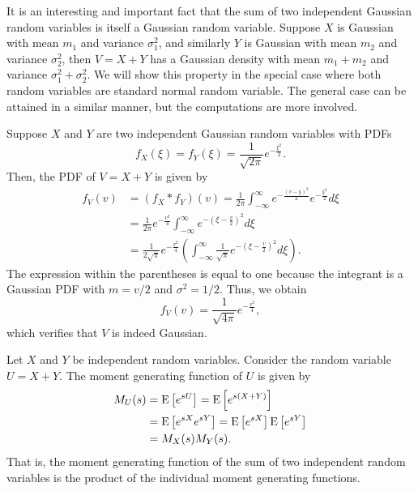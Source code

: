 \begin{example}
It is an interesting and important fact that the sum of two independent Gaussian random variables is itself a Gaussian random variable.
Suppose $X$ is Gaussian with mean $m_1$ and variance $\sigma_1^2$, and similarly $Y$ is Gaussian with mean $m_2$ and variance $\sigma_2^2$, then $V = X + Y$ has a Gaussian density with mean $m_1 + m_2$ and variance $\sigma_1^2 + \sigma_2^2$.
We will show this property in the special case where both random variables are standard normal random variable.
The general case can be attained in a similar manner, but the computations are more involved.

Suppose $X$ and $Y$ are two independent Gaussian random variables with PDFs
\begin{equation*}
f_X(\xi) = f_Y(\xi) = \frac 1{\sqrt{2\pi}} e^{-\frac{\xi^2}{2}} .
\end{equation*}
Then, the PDF of $V = X + Y$ is given by
\begin{equation*}
\begin{split}
f_V (v) &= (f_X \ast f_Y) (v)
= \frac{1}{2\pi}
\int_{-\infty}^{\infty} e^{-\frac{(v - \xi)^2}{2}} e^{-\frac{\xi^2}{2}} d\xi \\
&= \frac{1}{2\pi} e^{- \frac{v^2}{4}}
\int_{-\infty}^{\infty} e^{- \left( \xi - \frac{v}{2} \right)^2} d\xi \\
&= \frac{1}{2 \sqrt{\pi}} e^{- \frac{v^2}{4}}
\left( \int_{-\infty}^{\infty} \frac{1}{\sqrt{\pi}}
e^{-\left( \xi - \frac{v}{2} \right)^2} d\xi \right) .
\end{split}
\end{equation*}
The expression within the parentheses is equal to one because the integrant is a Gaussian PDF with $m = v/2$ and $\sigma^2 = 1/2$.
Thus, we obtain
\begin{equation*}
f_V(v) = \frac{1}{\sqrt{4\pi}} e^{-\frac{v^2}{4}} ,
\end{equation*}
which verifies that $V$ is indeed Gaussian.
\end{example}

Let $X$ and $Y$ be independent random variables.
Consider the random variable $U = X + Y$.
The moment generating function of $U$ is given by
\begin{equation*}
\begin{split}
M_U (s) &= \mathrm{E} \left[ e^{sU} \right]
= \mathrm{E} \left[ e^{s(X + Y)} \right] \\
&= \mathrm{E} \left[ e^{sX} e^{sY} \right]
= \mathrm{E} \left[ e^{sX} \right] \mathrm{E} \left[ e^{sY} \right] \\
&= M_X(s) M_Y(s) .
\end{split}
\end{equation*}
That is, the moment generating function of the sum of two independent random variables is the product of the individual moment generating functions.

